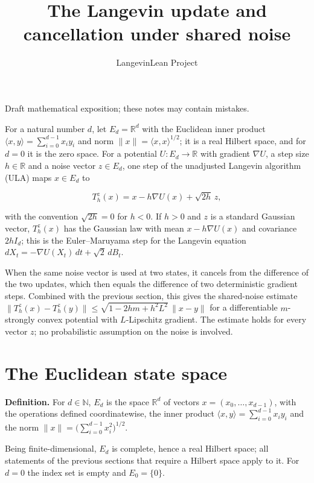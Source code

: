 \documentclass[11pt,a4paper]{article}
\title{\texorpdfstring{The Langevin update and cancellation under shared noise}{The Langevin update and cancellation under shared noise}}
\author{LangevinLean Project}
\date{}
\begin{document}
\maketitle
Draft mathematical exposition; these notes may contain mistakes.


For a natural number \(d\), let \(E_d=\mathbb R^d\) with the Euclidean inner product \(\langle x,y\rangle=\sum_{i=0}^{d-1}x_iy_i\) and norm \(\|x\|=\langle x,x\rangle^{1/2}\); it is a real Hilbert space, and for \(d=0\) it is the zero space. For a potential \(U:E_d\to\mathbb R\) with gradient \(\nabla U\), a step size \(h\in\mathbb R\) and a noise vector \(z\in E_d\), one step of the unadjusted Langevin algorithm (ULA) maps \(x\in E_d\) to


\[T_h^z(x)=x-h\nabla U(x)+\sqrt{2h}\,z,\]


with the convention \(\sqrt{2h}=0\) for \(h<0\). If \(h>0\) and \(z\) is a standard Gaussian vector, \(T_h^z(x)\) has the Gaussian law with mean \(x-h\nabla U(x)\) and covariance \(2hI_d\); this is the Euler–Maruyama step for the Langevin equation \(dX_t=-\nabla U(X_t)\,dt+\sqrt2\,dB_t\).




When the same noise vector is used at two states, it cancels from the difference of the two updates, which then equals the difference of two deterministic gradient steps. Combined with the previous section, this gives the shared-noise estimate \(\|T_h^z(x)-T_h^z(y)\|\le\sqrt{1-2hm+h^2L^2}\,\|x-y\|\) for a differentiable \(m\)-strongly convex potential with \(L\)-Lipschitz gradient. The estimate holds for every vector \(z\); no probabilistic assumption on the noise is involved.


\section{\texorpdfstring{The Euclidean state space}{The Euclidean state space}}


\textbf{Definition.} For \(d\in\mathbb N\), \(E_d\) is the space \(\mathbb R^d\) of vectors \(x=(x_0,\dots,x_{d-1})\), with the operations defined coordinatewise, the inner product \(\langle x,y\rangle=\sum_{i=0}^{d-1}x_iy_i\) and the norm \(\|x\|=\bigl(\sum_{i=0}^{d-1}x_i^2\bigr)^{1/2}\).




Being finite-dimensional, \(E_d\) is complete, hence a real Hilbert space; all statements of the previous sections that require a Hilbert space apply to it. For \(d=0\) the index set is empty and \(E_0=\{0\}\).
\end{document}

